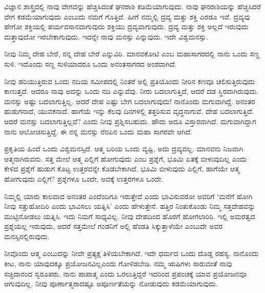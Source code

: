ವಿಜ್ಞಾನ ಶಾಸ್ತ್ರದಲ್ಲಿ ನಾವು ವೇಗವನ್ನು ಹೆಚ್ಚಿಸಿದಂತೆ ಘನರಾಶಿ  ಕಡಿಮೆಯಾಗುವುದು. ನಾವು ಘನರಾಶಿಯನ್ನು  ಹೆಚ್ಚಿಸಿದರೆ ವೇಗ ಕಡಮೆಯಾಗುವುದು ಎಂಬುದು ನಮಗೆ ಗೊತ್ತಿದೆ. ಹೀಗೆ ನಮ್ಮಲ್ಲಿ ದ್ರವ್ಯ ಮತ್ತು ಶಕ್ತಿ ಎರಡೂ ಇವೆ. ದ್ರವ್ಯವು ಹೇಗೋ ಶಕ್ತಿಯಲ್ಲಿ ಪರ್ಯವಸಾನವಾಗುವುದು ಶಕ್ತಿಯು ದ್ರವ್ಯವಾಗುವುದು. ದ್ರವ್ಯ ಮತ್ತು ಶಕ್ತಿ ಅಲ್ಲದೆ ಇರುವುದು ಮತ್ತಾವುದೋ ಇರಬೇಕಾಗುವುದು. ಇದನ್ನೇ ನಾವು ಮನಸ್ಸು ಎನ್ನುವುದು. ಇದೇ ವಿಶ್ವಮನಸ್ಸು.

\vskip 4pt

ನೀವು ನಿಮ್ಮ ದೇಹ ಬೇರೆ, ನನ್ನ ದೇಹ ಬೇರೆ ಎನ್ನುವಿರಿ. ಮಾನವಕೋಟಿ ಎಂಬ ಮಹಾಸಾಗರದಲ್ಲಿ ನಾನು ಒಂದು ಸಣ್ಣ ಸುಳಿ. ಇದೊಂದು ಸಣ್ಣ ಸುಳಿಯಾದರೂ ಒಂದು ಅನಂತಸಾಗರದ ಅಂಶವಾಗಿದೆ.

ನೀವು ಹರಿಯುತ್ತಿರುವ ಒಂದು ನದಿಯ ಸಮೀಪದಲ್ಲಿ ನಿಂತರೆ ಅಲ್ಲಿ ಪ್ರತಿಯೊಂದು ನೀರಿನ ಕಣವೂ ಚಲಿಸುತ್ತಿರುವುದು ಕಾಣುತ್ತದೆ. ಆದರೂ ನಾವು ಅದನ್ನು ಒಂದು ನದಿ ಎನ್ನುವೆವು. ನೀರು ಬದಲಾಗುತ್ತಿದೆ, ಆದರೆ ದಡ ಸ್ಥಿರವಾಗಿರುವುದು. ಮನಸ್ಸು ಅಷ್ಟು ಬದಲಾಗುತ್ತಿಲ್ಲ. ಆದರೆ ದೇಹ ಎಷ್ಟು ಬೇಗ ಬದಲಾಗುವುದು! ನಾನೊಂದು ಮಗುವಾಗಿದ್ದೆ. ಅನಂತರ ಹುಡುಗನಾದೆ, ಯುವಕನಾದೆ. ಹಾಗೆಯೆ ಇನ್ನು ಕೆಲವು ದಿನಗಳಲ್ಲಿ ತತ್ತರಿಸುವ ವೃದ್ಧನಾಗುವೆ. ದೇಹ ಬದಲಾಗುತ್ತಿದೆ. ಆದರೆ ಮನಸ್ಸು ಬದಲಾಗುತ್ತಿಲ್ಲವೆ? ಎಂದು ನೀವು ಪ್ರಶ್ನಿಸಬಹುದು. ಹೌದು ಅದೂ ವಿಸ್ತಾರವಾಗಿದೆ. ಮಗುವಾಗಿದ್ದಾಗ ನಾನು ಆಲೋಚಿಸುತ್ತಿದ್ದೆ. ಈ ನನ್ನ ಮನಸ್ಸು ನೆನಪಿನ ಒಂದು ಮಹಾ ಸಾಗರವೇ ಆಗಿದೆ.

ಪ್ರಕೃತಿಯ ಹಿಂದೆ ಒಂದು ವಿಶ್ವಮನಸ್ಸಿದೆ. ಆತ್ಮ ಬರಿಯ ಒಂದು ವ್ಯಷ್ಟಿ, ಅದು ದ್ರವ್ಯವಲ್ಲ. ಮಾನವನು ನಿಜವಾಗಿ ಆತ್ಮನಾಗಿರುವನು. ಸತ್ತ ಮೇಲೆ ಆತ್ಮ ಎಲ್ಲಿಗೆ ಹೋಗುವುದು ಎಂಬ ಪ್ರಶ್ನೆಗೆ, ಭೂಮಿ ಏತಕ್ಕೆ ಬೀಳುವುದಿಲ್ಲ ಎಂದು ಕೇಳಿದ ಪ್ರಶ್ನೆಗೆ ಹುಡುಗ ಕೊಟ್ಟ ಉತ್ತರವನ್ನೇ ಕೊಡಬೇಕಾಗಿದೆ. ಭೂಮಿ ಬೀಳುವುದು ಎಲ್ಲಿಗೆ, ಹಾಗೆಯೇ ಆತ್ಮ ಹೋಗುವುದು ಎಲ್ಲಿಗೆ? ಪ್ರಶ್ನೆಗಳೂ ಒಂದೇ, ಅವಕ್ಕೆ ಉತ್ತರಗಳೂ ಒಂದೇ.

ನಿಮ್ಮಲ್ಲಿ ಯಾರು ಕಾಲವಾದ ಅನಂತರ ಎಂದೆಂದಿಗೂ ಇರುತ್ತೇವೆ ಎಂದು ಭಾವಿಸುವರೋ ಅವರಿಗೆ ‘ಮನೆಗೆ ಹೋಗಿ ನೀವು ಸತ್ತುಹೋದಿರಿ ಎಂದು ಭಾವಿಸಲು ಯತ್ನಿಸಿ’ ಎಂದು ಹೇಳುತ್ತೇನೆ. ಹತ್ತಿರ ನಿಂತುಕೊಂಡು ನಿಮ್ಮ ಸತ್ತದೇಹವನ್ನು ಮುಟ್ಟಿನೋಡಲು ಯತ್ನಿಸಿ. ಇದು ನಿಮಗೆ ಸಾಧ್ಯವಿಲ್ಲ. ನೀವು ದೇಹದಿಂದ ಹೊರಗೆ ಹೋಗಲಾರಿರಿ. ಇಲ್ಲಿ ಅಮರತ್ವದ ಪ್ರಶ್ನೆಯಲ್ಲ ಇರುವುದು, ಆದರೆ ಸತ್ತಮೇಲೆ ಗಂಡನಿಗೆ ಅಲ್ಲಿ ಹೆಂಡತಿ ಸಿಕ್ಕುತ್ತಾಳೆಯೇ ಎಂಬುದೇ ಅವರ ಮನಸ್ಸಿನಲ್ಲಿರುವುದು.

ನೀವೊಂದು ಆತ್ಮ ಎಂಬುದನ್ನು ನೀವೇ ಪ್ರತ್ಯಕ್ಷ ತಿಳಿಯಬೇಕಾಗಿದೆ. ಇದೇ ಧರ್ಮದ ಒಂದು ದೊಡ್ಡ ರಹಸ್ಯ. ನಾನೊಂದು ಕೀಟ, ನಾನು ಯಾವುದಕ್ಕೂ ಪ್ರಯೋಜನವಿಲ್ಲ\break ಎಂದು ಗೋಳಿಡಬೇಡಿ. ನಮ್ಮ ಋಷಿಗಳು ಸಾರುವಂತೆ ನಾವು ಸಚ್ಚಿದಾನಂದ ಸ್ವರೂಪರು. ನಾನು ಪಾಪಾತ್ಮ ಎಂದು ಒರಲುತ್ತಿದ್ದರೆ ಇದರಿಂದ ಪ್ರಪಂಚಕ್ಕೆ ಯಾವ ಪ್ರಯೋಜನವೂ ಆಗುವುದಿಲ್ಲ. ನೀವು ಪೂರ್ಣಾತ್ಮರಾದಷ್ಟೂ ಅಪೂರ್ಣತೆಯನ್ನು ನೋಡುವುದು ಕಡಮೆಯಾಗುವುದು.

